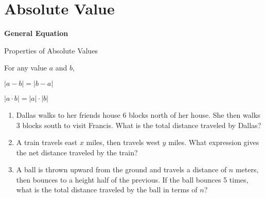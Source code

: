 \section{Absolute Value}

\bigskip
\textbf{General Equation}

\bigskip
\begin{equationbox}{Properties of Absolute Values}
\setlength{\columnseprule}{0pt}

For any value $a$ and $b$,

\begin{center}
\begin{multicols}{2}
$|a-b|=|b-a|$

$|a\cdot b|=|a|\cdot|b|$
\end{multicols}
\end{center}
\end{equationbox}

\vfill
\begin{enumerate}[labelindent=*,style=multiline,leftmargin=*,label=\textbf{Example \arabic*:}]
\item Dallas walks to her friends house 6 blocks north of her house. She then walks 3 blocks south to visit Francis. What is the total distance traveled by Dallas?

\vfill\item A train travels east $x$ miles, then travels west $y$ miles. What expression gives the net distance traveled by the train?

\vfill\item A ball is thrown upward from the ground and travels a distance of $n$ meters, then bounces to a height half of the previous. If the ball bounces 5 times, what is the total distance traveled by the ball in terms of $n$?
\end{enumerate}

